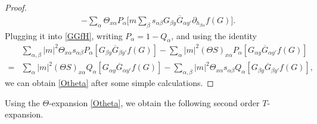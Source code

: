 \documentclass{article}
\newcommand{\1}{\mathds{1}}
\numberwithin{equation}{section}
\newcommand{\al}{\alpha}
\newcommand{\fa}{{\mathfrak a}}
\newcommand{\fb}{{\mathfrak b}}
\theoremstyle{plain} %
\theoremstyle{remark}
\begin{document}
\begin{proof}
\begin{align*}
&- \sum_\al \Theta_{x\al}  P_\al\bigg[  m \sum_\beta s_{\al\beta}G_{\beta y} \overline G_{\al y'} \partial_{ h_{\beta\al}}f(G)\bigg].
\end{align*}
Plugging it into \eqref{GGfH}, writing $P_\al = 1-Q_\al$, and using the identity
\begin{align*}  
&\sum_{\al,\beta} |m|^2 \Theta_{x\al} s_{\al\beta}   P_\al\left[ G_{\beta y}\overline G_{\beta y'}  f(G)\right]  -  \sum_\al  |m|^2 (\Theta S)_{x\al} P_\al\left[G_{\al y} \overline G_{\al y'} f(G)\right] \\
=& \sum_\al  |m|^2 (\Theta S)_{x\al} Q_\al\left[G_{\al y} \overline G_{\al y'} f(G)\right] - \sum_{\al,\beta} |m|^2 \Theta_{x\al} s_{\al\beta}   Q_\al\left[ G_{\beta y}\overline G_{\beta y'}  f(G)\right]  ,
\end{align*} 
we can obtain \eqref{Otheta} after some simple calculations.
\end{proof}


Using the $\Theta$-expansion \eqref{Otheta}, we obtain the following second order $T$-expansion. %
  
\end{document}
